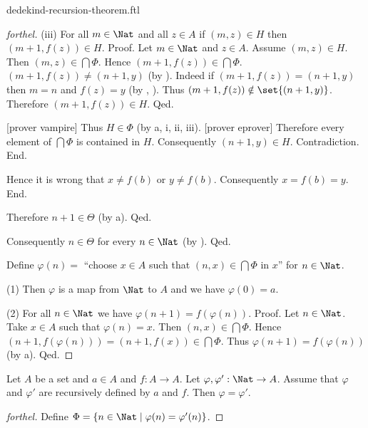 \documentclass{naproche-library}
\begin{document}
\begin{smodule}{dedekind-recursion-theorem.ftl}
\begin{proof}[forthel]
            (iii) For all $m \in \Nat$ and all $z \in A$ if $(m,z) \in H$ then $(m + 1,f(z)) \in H$. \newline
            Proof.
              Let $m \in \Nat$ and $z \in A$.
              Assume $(m,z) \in H$.
              Then $(m,z) \in \bigcap \Phi$.
              Hence $(m + 1,f(z)) \in \bigcap \Phi$.
              $(m + 1,f(z)) \neq (n + 1,y)$ (by ).
              Indeed if $(m + 1,f(z)) = (n + 1,y)$ then $m = n$ and $f(z) = y$ (by , ).
              Thus $(m + 1,f(z)) \notin \set{(n + 1,y)}$.
              Therefore $(m + 1,f(z)) \in H$.
            Qed.

            [prover vampire]
            Thus $H \in \Phi$ (by a, i, ii, iii).
            [prover eprover]
            Therefore every element of $\bigcap \Phi$ is contained in $H$.
            Consequently $(n + 1,y) \in H$.
            Contradiction.
          End.

          Hence it is wrong that $x \neq f(b)$ or $y \neq f(b)$.
          Consequently $x = f(b) = y$.
        End.

        Therefore $n + 1 \in \Theta$ (by a).
      Qed.

      Consequently $n \in \Theta$ for every $n \in \Nat$ (by ).
    Qed.

    Define $\varphi(n) =$ ``choose $x \in A$ such that $(n, x) \in
    \bigcap \Phi$ in $x$'' for $n \in \Nat$.

    (1) Then $\varphi$ is a map from $\Nat$ to $A$ and we have
    $\varphi(0) = a$.

    (2) For all $n \in \Nat$ we have $\varphi(n + 1) =
    f(\varphi(n))$. \newline
    Proof.
      Let $n \in \Nat$.
      Take $x \in A$ such that $\varphi(n) = x$.
      Then $(n, x) \in \bigcap \Phi$.
      Hence $(n + 1, f(\varphi(n))) = (n + 1, f(x)) \in \bigcap \Phi$.
      Thus $\varphi(n + 1) = f(\varphi(n))$ (by a).
    Qed.
  \end{proof}
  
  \begin{theorem*}[forthel,title=Dedekind's Recursion Theorem: Uniqueness,id=dedekind_uniqueness]
    Let $A$ be a set and $a \in A$ and $f : A \to A$.
    Let $\varphi, \varphi' : \Nat \to A$.
    Assume that $\varphi$ and $\varphi'$ are recursively defined by $a$ and
    $f$.
    Then $\varphi = \varphi'$.
  \end{theorem*}
  \begin{proof}[forthel]
    Define $\Phi = \{ n \in \Nat \mid \varphi(n) = \varphi'(n) \}$.


\end{proof}
\end{smodule}
\end{document}
